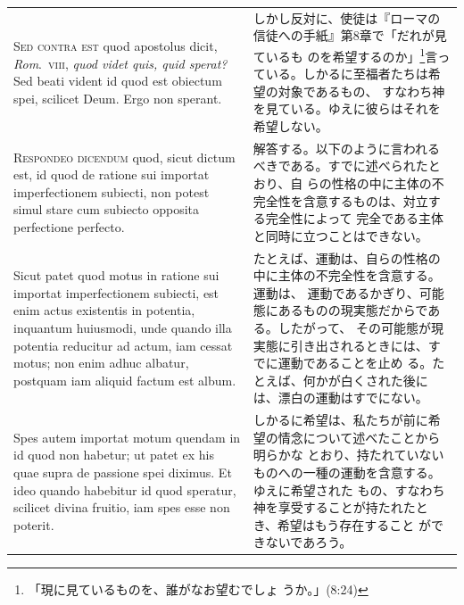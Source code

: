 \documentclass[paper=a4paper,fontsize=10pt,jafontsize=9pt,titlepage]{jlreq}
\begin{document}
\begin{longtable}{p{21em}p{21em}}
\\


 {\scshape Sed contra est} quod apostolus dicit, {\itshape
 Rom}.~{\scshape viii}, {\itshape quod videt quis, quid sperat?} Sed
 beati vident id quod est obiectum spei, scilicet Deum. Ergo non
 sperant.
 
 &

 しかし反対に、使徒は『ローマの信徒への手紙』第8章で「だれが見ているも
 のを希望するのか」\footnote{「現に見ているものを、誰がなお望むでしょ
 うか。」(8:24)}言っている。しかるに至福者たちは希望の対象であるもの、
 すなわち神を見ている。ゆえに彼らはそれを希望しない。

\\

 {\scshape Respondeo dicendum} quod, sicut dictum est, id quod de
 ratione sui importat imperfectionem subiecti, non potest simul stare
 cum subiecto opposita perfectione perfecto.

 &

 解答する。以下のように言われるべきである。すでに述べられたとおり、自
 らの性格の中に主体の不完全性を含意するものは、対立する完全性によって
 完全である主体と同時に立つことはできない。

 \\

 Sicut patet quod motus in
 ratione sui importat imperfectionem subiecti, est enim actus
 existentis in potentia, inquantum huiusmodi, unde quando illa
 potentia reducitur ad actum, iam cessat motus; non enim adhuc
 albatur, postquam iam aliquid factum est album.

 &

 たとえば、運動は、自らの性格の中に主体の不完全性を含意する。運動は、
 運動であるかぎり、可能態にあるものの現実態だからである。したがって、
 その可能態が現実態に引き出されるときには、すでに運動であることを止め
 る。たとえば、何かが白くされた後には、漂白の運動はすでにない。

 \\

 Spes autem importat motum quendam in id quod non habetur; ut patet ex
 his quae supra de passione spei diximus. Et ideo quando habebitur id
 quod speratur, scilicet divina fruitio, iam spes esse non poterit.
 
&

 しかるに希望は、私たちが前に希望の情念について述べたことから明らかな
 とおり、持たれていないものへの一種の運動を含意する。ゆえに希望された
 もの、すなわち神を享受することが持たれたとき、希望はもう存在すること
 ができないであろう。


\end{longtable}
\end{document}

